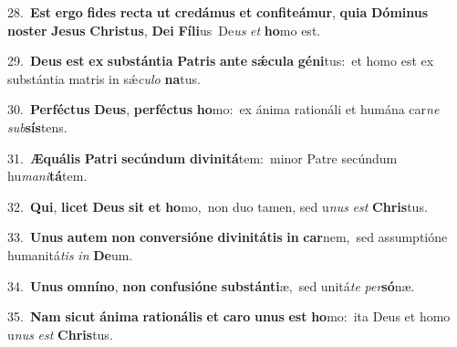 {{\numbfont\textcolor{\numbcolor}{28.}}~\textbf{Est} \textbf{er}\-\textbf{go} \textbf{fi}\-\textbf{des} \textbf{rec}\-\textbf{ta} \textbf{ut} \textbf{cre}\-\textbf{dá}\textbf{mus} \textbf{et} \textbf{con}\-\textbf{fi}\textbf{te}\textbf{á}\textbf{mur}, \textbf{qui}\-\textbf{a} \textbf{Dó}\-\textbf{mi}\textbf{nus} \textbf{nos}\-\textbf{ter} \textbf{Je}\-\textbf{sus} \textbf{Chris}\-\textbf{tus}, \textbf{De}\-\textbf{i} \textbf{Fí}\-\textbf{li}us~\star De\textit{us} \textit{et} \textbf{ho}\-mo est.\par
{\numbfont\textcolor{\numbcolor}{29.}}~\-\textbf{De}\-\textbf{us} \textbf{est} \textbf{ex} \textbf{sub}\-\textbf{stán}\textbf{ti}\textbf{a} \textbf{Pa}\-\textbf{tris} \textbf{an}\-\textbf{te} \textbf{sǽ}\-\textbf{cu}\textbf{la} \textbf{gé}\-\textbf{ni}tus:~\star et homo est ex substántia matris in sǽ\-\textit{cu}\-\textit{lo} \textbf{na}\-tus.\par
{\numbfont\textcolor{\numbcolor}{30.}}~\-\textbf{Per}\-\textbf{féc}\textbf{tus} \textbf{De}\-\textbf{us}, \textbf{per}\-\textbf{féc}\textbf{tus} \textbf{ho}\-mo:~\star ex ánima rationáli et humána car\textit{ne} \textit{sub}\-\textbf{sís}tens.\par
{\numbfont\textcolor{\numbcolor}{31.}}~\-\textbf{Æ}\-\textbf{quá}\textbf{lis} \textbf{Pa}\-\textbf{tri} \textbf{se}\-\textbf{cún}\textbf{dum} \textbf{di}\-\textbf{vi}\textbf{ni}\textbf{tá}tem:~\star minor Patre secúndum hu\-\textit{ma}\-\textit{ni}\textbf{tá}tem.\par
{\numbfont\textcolor{\numbcolor}{32.}}~\-\textbf{Qui}\-, \textbf{li}\-\textbf{cet} \textbf{De}\-\textbf{us} \textbf{sit} \textbf{et} \textbf{ho}\-mo,~\star non duo tamen, sed u\textit{nus} \textit{est} \textbf{Chris}\-tus.\par
{\numbfont\textcolor{\numbcolor}{33.}}~\-\textbf{U}\-\textbf{nus} \textbf{au}\-\textbf{tem} \textbf{non} \textbf{con}\-\textbf{ver}\textbf{si}\textbf{ó}\textbf{ne} \textbf{di}\-\textbf{vi}\textbf{ni}\textbf{tá}\textbf{tis} \textbf{in} \textbf{car}\-nem,~\star sed assumptióne humanitá\textit{tis} \textit{in} \textbf{De}\-um.\par
{\numbfont\textcolor{\numbcolor}{34.}}~\-\textbf{U}\-\textbf{nus} \textbf{om}\-\textbf{ní}\textbf{no}, \textbf{non} \textbf{con}\-\textbf{fu}\textbf{si}\textbf{ó}\textbf{ne} \textbf{sub}\-\textbf{stán}\textbf{ti}æ,~\star sed unitá\textit{te} \textit{per}\-\textbf{só}næ.\par
{\numbfont\textcolor{\numbcolor}{35.}}~\textbf{Nam} \textbf{sic}\-\textbf{ut} \textbf{á}\-\textbf{ni}\textbf{ma} \textbf{ra}\-\textbf{ti}\textbf{o}\textbf{ná}\textbf{lis} \textbf{et} \textbf{ca}\-\textbf{ro} \textbf{u}\-\textbf{nus} \textbf{est} \textbf{ho}\-mo:~\star ita Deus et homo u\textit{nus} \textit{est} \textbf{Chris}\-tus.\par
}
